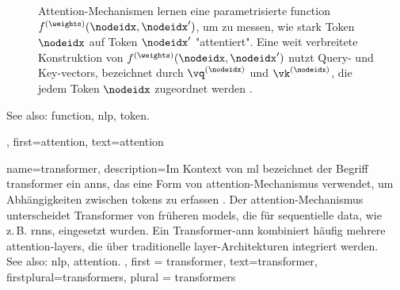 {{\begin{figure}[H]
		\caption{Attention-Mechanismen lernen eine parametrisierte \gls{function} $f^{(\weights)}(\nodeidx,\nodeidx')$, um zu messen, 
		wie stark Token $\nodeidx$ auf Token $\nodeidx'$ "attentiert". Eine weit verbreitete Konstruktion von 
		$f^{(\weights)}(\nodeidx,\nodeidx')$ nutzt Query- und Key-\glspl{vector}, bezeichnet durch 
		$\vq^{(\nodeidx)}$ und $\vk^{(\nodeidx)}$, die jedem Token $\nodeidx$ zugeordnet werden \cite{vaswani2017attention}. 
		\label{fig_attention_dict}}
	\end{figure}
	See also: \gls{function}, \gls{nlp}, \gls{token}.},
	first={attention},
	text={attention}
}

{name={transformer},
 description={Im Kontext von \gls{ml} bezeichnet der Begriff transformer 
 	ein \glspl{ann}, das eine Form von \gls{attention}-Mechanismus verwendet, 
 	um Abhängigkeiten zwischen \glspl{token} zu erfassen \cite{vaswani2017attention}. 
 	Der \gls{attention}-Mechanismus unterscheidet Transformer von früheren 
	\glspl{model}, die für sequentielle \gls{data}, wie z. B. \glspl{rnn}, eingesetzt wurden. 
	Ein Transformer-\gls{ann} kombiniert häufig mehrere \gls{attention}-\glspl{layer}, 
	die über traditionelle \gls{layer}-Architekturen integriert werden.\\
	See also: \gls{nlp}, \gls{attention}.
  }, 
 first = {transformer}, 
 text={transformer},
 firstplural={transformers}, 
 plural = {transformers}
}

